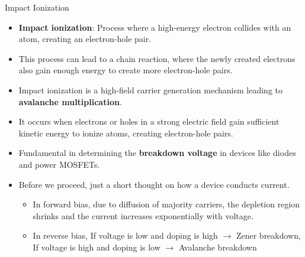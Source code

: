 \begin{frame}{Impact Ionization}
    \begin{itemize}
        \item \textbf{Impact ionization}: Process where a high-energy electron collides with an atom, creating an electron-hole pair.
        \item This process can lead to a chain reaction, where the newly created electrons also gain enough energy to create more electron-hole pairs.
        \item Impact ionization is a high-field carrier generation mechanism leading to \textbf{avalanche multiplication}.
        \item It occurs when electrons or holes in a strong electric field gain sufficient kinetic energy to ionize atoms, creating electron-hole pairs.
        \item Fundamental in determining the \textbf{breakdown voltage} in devices like diodes and power MOSFETs.
        \item Before we proceed, just a short thought on how a device conducts current.
            \begin{itemize}
                \item In forward bias, due to diffusion of majority carriers, the depletion region shrinks and the current increases exponentially with voltage.
                \item In reverse bias, If voltage is low and doping is high $\rightarrow$ Zener breakdown, \\
                If voltage is high and doping is low $\rightarrow$ Avalanche breakdown
            \end{itemize}
    \end{itemize}
\end{frame}